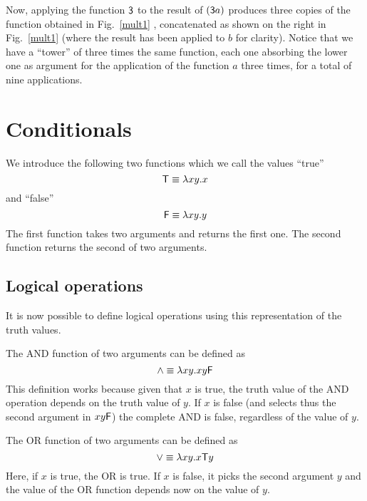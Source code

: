 


Now, applying the function ${\sf 3}$ to the result of $({\sf 3}a)$ produces three copies of the function obtained in Fig.~\ref{mult1} , concatenated as shown on the right in Fig.~\ref{mult1} (where the result has been applied to $b$  for clarity). Notice that we have a ``tower'' of three times the same function, each one absorbing the lower one as argument for the application of the function $a$ three times, for a total of nine applications.




\section{Conditionals}
We introduce the following two functions which we call the values ``true''
$${\sf T}\equiv \lambda xy.x$$ and ``false''
$${\sf F}\equiv \lambda xy.y$$
The first function takes two arguments and returns the first one. The second function returns the second of two arguments.


\subsection{Logical operations}
It is now possible to define logical operations using this representation of the truth values.

The {\sf AND} function of two arguments can be defined as
$${\sf \wedge} \equiv \lambda xy.xy {\sf F}$$ 
This definition works because given that $x$ is true, the truth value of the AND operation depends on the truth value of $y$. If $x$ is false (and selects thus the second argument in $xy{\sf F}$) the complete AND is false, regardless of the value of $y$.

The {\sf OR} function of two arguments can be defined as 
$${\sf \vee} \equiv \lambda xy.x {\sf T} y$$
Here, if $x$ is true, the OR is true. If $x$ is false, it picks the second argument $y$ and the value of the OR function depends now on the value of $y$.


